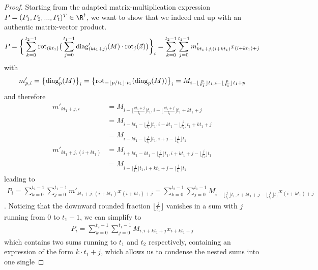 \begin{proof}
  Starting from the adapted matrix-multiplication expression $P = (P_1, P_2, ..., P_t)^T \in \R^t$,
  we want to show that we indeed end up with an authentic matrix-vector product.
  \begin{align*}
    P = \bigg\{\sum_{k=0}^{t_2-1} \mathrm{rot}_{(kt_1)} \big(
    \sum_{j=0}^{t_1-1} \mathrm{diag}'_{(kt_1+j)}(M) \cdot \mathrm{rot}_j(\vec{x})
    \big)\bigg\}_i = \sum_{k=0}^{t_2-1} \sum_{j=0}^{t_1-1} m'_{kt_1+j,(i+kt_1)} x_{(i+kt_1)+j}
  \end{align*}
  with
  \begin{align*}
    m'_{p,i} = \big\{ \mathrm{diag}'_p(M)\big \}_i = \big\{ \mathrm{rot}_{-\lfloor p/t_1 \rfloor \cdot t_1}(\mathrm{diag}_p(M)) \big\}_i
    = M_{i-\lfloor\frac{p}{t_1}\rfloor t_1, i-\lfloor\frac{p}{t_1}\rfloor t_1 + p}
  \end{align*}
  and therefore
  \begin{align*}
    m'_{kt_1+j,i}        & = M_{i-\lfloor\frac{kt_1+j}{t_1}\rfloor t_1, i-\lfloor\frac{kt_1+j}{t_1}\rfloor t_1 + kt_1+j} \\
                         & = M_{i-kt_1-\lfloor\frac{j}{t_1}\rfloor t_1, i-kt_1-\lfloor\frac{j}{t_1}\rfloor t_1 + kt_1+j} \\
                         & = M_{i-kt_1-\lfloor\frac{j}{t_1}\rfloor t_1, i+j-\lfloor\frac{j}{t_1}\rfloor t_1}             \\
    m'_{kt_1+j,(i+kt_1)} & = M_{i+kt_1-kt_1-\lfloor\frac{j}{t_1}\rfloor t_1, i+kt_1+j-\lfloor\frac{j}{t_1}\rfloor t_1}   \\
                         & = M_{i-\lfloor\frac{j}{t_1}\rfloor t_1, i+kt_1+j-\lfloor\frac{j}{t_1}\rfloor t_1}
  \end{align*}
  leading to
  \begin{align*}
    P_i = \sum_{k=0}^{t_2-1} \sum_{j=0}^{t_1-1} m'_{kt_1+j,(i+kt_1)} x_{(i+kt_1)+j}
    = \sum_{k=0}^{t_2-1} \sum_{j=0}^{t_1-1} M_{i-\lfloor\frac{j}{t_1}\rfloor t_1, i+kt_1+j-\lfloor\frac{j}{t_1}\rfloor t_1} x_{(i+kt_1)+j}
  \end{align*}
  . Noticing that the downward rounded fraction $\lfloor\frac{j}{t_1}\rfloor$ vanishes
  in a sum with $j$ running from $0$ to $t_1-1$, we can simplify to
  \begin{align*}
    P_i = \sum_{k=0}^{t_2-1} \sum_{j=0}^{t_1-1} M_{i,i+kt_1+j} x_{i+kt_1+j}
  \end{align*}
  which contains two sums running to $t_1$ and $t_2$ respectively, containing an expression
  of the form $k \cdot t_1 + j$, which allows us to condense the nested sums into one single

\end{proof}
